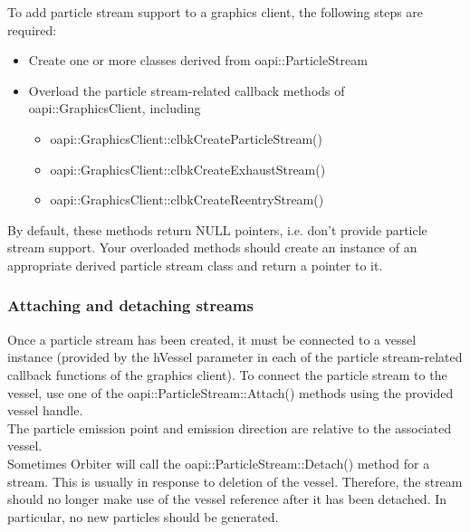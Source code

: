 \documentclass[Orbiter Developer Manual.tex]{subfiles}
\begin{document}
To add particle stream support to a graphics client, the following steps are required:
\begin{itemize}
\item Create one or more classes derived from oapi::ParticleStream
\item Overload the particle stream-related callback methods of oapi::GraphicsClient, including
\begin{itemize}
\item oapi::GraphicsClient::clbkCreateParticleStream()
\item oapi::GraphicsClient::clbkCreateExhaustStream()
\item oapi::GraphicsClient::clbkCreateReentryStream()
\end{itemize}
\end{itemize}

\noindent
By default, these methods return NULL pointers, i.e. don't provide particle stream support. Your overloaded methods should create an instance of an appropriate derived particle stream class and return a pointer to it.



\subsubsection{Attaching and detaching streams}
Once a particle stream has been created, it must be connected to a vessel instance (provided by the hVessel parameter in each of the particle stream-related callback functions of the graphics client). To connect the particle stream to the vessel, use one of the oapi::ParticleStream::Attach() methods using the provided vessel handle.\\
The particle emission point and emission direction are relative to the associated vessel.\\
Sometimes Orbiter will call the oapi::ParticleStream::Detach() method for a stream. This is usually in response to deletion of the vessel. Therefore, the stream should no longer make use of the vessel reference after it has been detached. In particular, no new particles should be generated.

\end{document}
